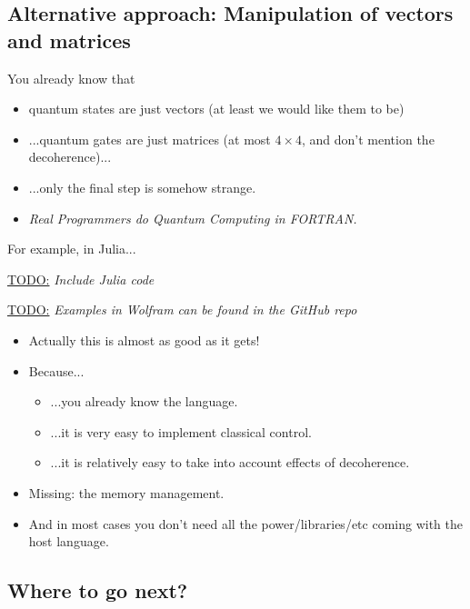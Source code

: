 \documentclass[a4paper,11pt]{article}
\newcommand{\todo}[1]{%
    \par\vspace{6pt}\noindent\underline{\textsc{TODO:}} \emph{#1}\vspace{6pt}%
}
\begin{document}
\subsection{Alternative approach: Manipulation of vectors and matrices}

You already know that
\begin{itemize}
    \item quantum states are just vectors (at least we would like them 
    to 
    be)
    \item ...quantum gates are just matrices (at most $4\times 4$, and 
    don't mention the decoherence)...
    \item ...only the final step is somehow strange.
    \item{\emph{Real Programmers do Quantum Computing in FORTRAN.}}
\end{itemize}


For example, in Julia... \\[12pt] 


\todo{Include Julia code}

\todo{Examples in Wolfram can be found in the GitHub repo}


\begin{itemize}
\item Actually this is almost as good as it gets!
\item Because...
\begin{itemize}
\item ...you already know the language.
\item ...it is very easy to implement 
classical control.
\item ...it is relatively easy to take into account effects of 
decoherence.
\end{itemize}
\item Missing: the memory management.
\item And in most cases you don't need all the power/libraries/etc 
coming with the host language.
\end{itemize}


\subsection{Where to go next?}
\end{document}
